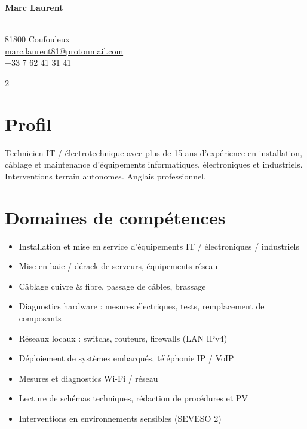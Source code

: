 \documentclass[11pt,a4paper]{article}
\begin{document}

{\Huge \textbf{Marc Laurent}}\

\\[4pt]
81800 Coufouleux\\
\href{mailto:marc.laurent81@protonmail.com}{marc.laurent81@protonmail.com}\\
+33 7 62 41 31 41

\vspace{1em}

\begin{paracol}{2}


\section*{Profil}
Technicien IT / électrotechnique avec plus de 15 ans d'expérience en installation,
câblage et maintenance d'équipements informatiques, électroniques et industriels.
Interventions terrain autonomes. Anglais professionnel.

\section*{Domaines de compétences}
\begin{itemize}[leftmargin=*]
  \item Installation et mise en service d'équipements IT / électroniques / industriels
  \item Mise en baie / dérack de serveurs, équipements réseau
  \item Câblage cuivre \& fibre, passage de câbles, brassage
  \item Diagnostics hardware : mesures électriques, tests, remplacement de composants
  \item Réseaux locaux : switchs, routeurs, firewalls (LAN IPv4)
  \item Déploiement de systèmes embarqués, téléphonie IP / VoIP
  \item Mesures et diagnostics Wi-Fi / réseau
  \item Lecture de schémas techniques, rédaction de procédures et PV
  \item Interventions en environnements sensibles (SEVESO 2)
\end{itemize}


\end{paracol}
\end{document}
